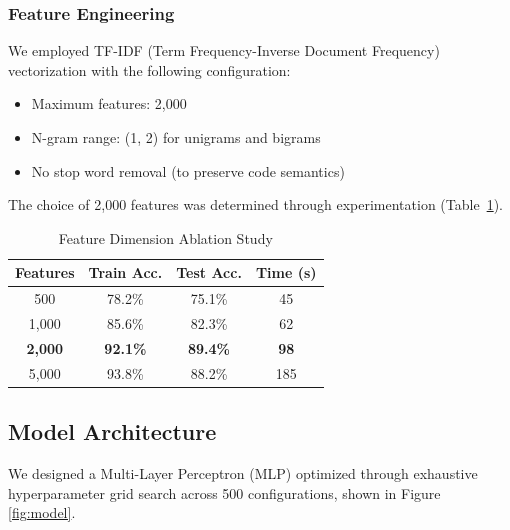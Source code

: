 \documentclass[conference]{IEEEtran}
\begin{document}
\subsubsection{Feature Engineering}

We employed TF-IDF (Term Frequency-Inverse Document Frequency) vectorization with the following configuration:

\begin{itemize}
    \item Maximum features: 2,000
    \item N-gram range: (1, 2) for unigrams and bigrams
    \item No stop word removal (to preserve code semantics)
\end{itemize}

The choice of 2,000 features was determined through experimentation (Table~\ref{tab:features}).

\begin{table}[h]
\centering
\caption{Feature Dimension Ablation Study}
\label{tab:features}
\begin{tabular}{@{}cccc@{}}
\toprule
\textbf{Features} & \textbf{Train Acc.} & \textbf{Test Acc.} & \textbf{Time (s)} \\ \midrule
500 & 78.2\% & 75.1\% & 45 \\
1,000 & 85.6\% & 82.3\% & 62 \\
\textbf{2,000} & \textbf{92.1\%} & \textbf{89.4\%} & \textbf{98} \\
5,000 & 93.8\% & 88.2\% & 185 \\ \bottomrule
\end{tabular}
\end{table}

\subsection{Model Architecture}

We designed a Multi-Layer Perceptron (MLP) optimized through exhaustive hyperparameter grid search across 500 configurations, shown in Figure \ref{fig:model}.
\end{document}
